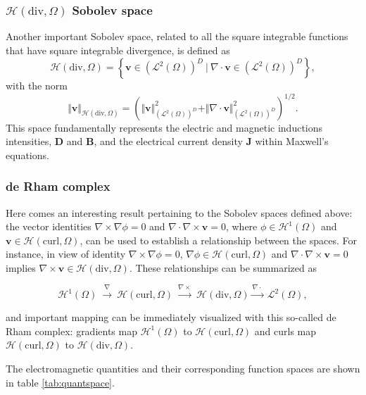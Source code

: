 \subsubsection{\texorpdfstring{$\mathcal{H}(\mathrm{div},\Omega)$ Sobolev space}{Hdiv Sobolev space}}
%
Another important Sobolev space, related to all the square integrable functions that have square integrable divergence, is defined as
%
$$\mathcal{H}(\mathrm{div},\Omega) = \left\lbrace \mathbf{v} \in (\mathcal{L}^2(\Omega))^D \ | \ \nabla  \cdot \mathbf{v} \in (\mathcal{L}^2(\Omega))^D \right\rbrace,$$
%
\noindent with the norm
%
$$\Vert\mathbf{v}\Vert_{\mathcal{H}(\mathrm{div},\Omega)} = \left( \Vert \mathbf{v} \Vert_{(\mathcal{L}^2(\Omega))^D}^2 + \Vert\nabla \cdot \mathbf{v} \Vert_{(\mathcal{L}^2(\Omega))^D}^2 \right)^{1/2}.$$
%
\noindent This space fundamentally represents the electric and magnetic inductions intensities, $\mathbf{D}$ and $\mathbf{B}$, and the electrical current density $\mathbf{J}$ within Maxwell's equations.
%
\subsubsection{de Rham complex}
%
Here comes an interesting result pertaining to the Sobolev spaces defined above: the vector identities $\nabla \times \nabla \phi = 0$ and $\nabla \cdot \nabla \times \mathbf{v} = 0$, where $\phi \in \mathcal{H}^1(\Omega)$ and $\mathbf{v} \in \mathcal{H}(\mathrm{curl},\Omega)$, can be used to establish a relationship between the spaces. For instance, in view of identity $\nabla \times \nabla \phi = 0$, $\nabla \phi \in \mathcal{H}(\mathrm{curl},\Omega)$ and $\nabla \cdot \nabla \times \mathbf{v} = 0$ implies $\nabla \times \mathbf{v} \in \mathcal{H}(\mathrm{div},\Omega)$. These relationships can be summarized as

$$\mathcal{H}^1(\Omega) \ \stackrel{\nabla}{  \longrightarrow} \ \mathcal{H}(\mathrm{curl},\Omega) \ \stackrel{ \nabla\times}{ \longrightarrow} \ \mathcal{H}(\mathrm{div},\Omega) \stackrel{\nabla\cdot}{ \longrightarrow} \ \mathcal{L}^2(\Omega),$$

\noindent and important mapping can be immediately visualized with this so-called de Rham complex: gradients map $\mathcal{H}^1(\Omega)$ to $\mathcal{H}(\mathrm{curl},\Omega)$ and curls map $\mathcal{H}(\mathrm{curl},\Omega)$ to $\mathcal{H}(\mathrm{div},\Omega)$. 

The electromagnetic quantities and their corresponding function spaces are shown in table \ref{tab:quantspace}.



